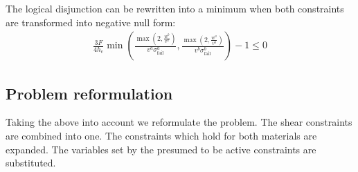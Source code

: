 The logical disjunction can be rewritten into a minimum when both constraints are transformed into negative null form:
\begin{align*}
	\frac{3 F}{4 h_\text{c}}  \min{\left( \frac{ \max{\left( 2, \frac{w^b}{v^a} \right)} }{ v^a \sigma^a_\text{fail} }  
	, \frac{ \max{\left( 2, \frac{w^a}{v^b} \right)} }{ v^b \sigma^b_\text{fail} }   \right)} - 1 \le 0  
\end{align*}

\subsection{Problem reformulation}
Taking the above into account we reformulate the problem.
The shear constraints are combined into one.
The constraints which hold for both materials are expanded.
The variables set by the presumed to be active constraints are substituted.

